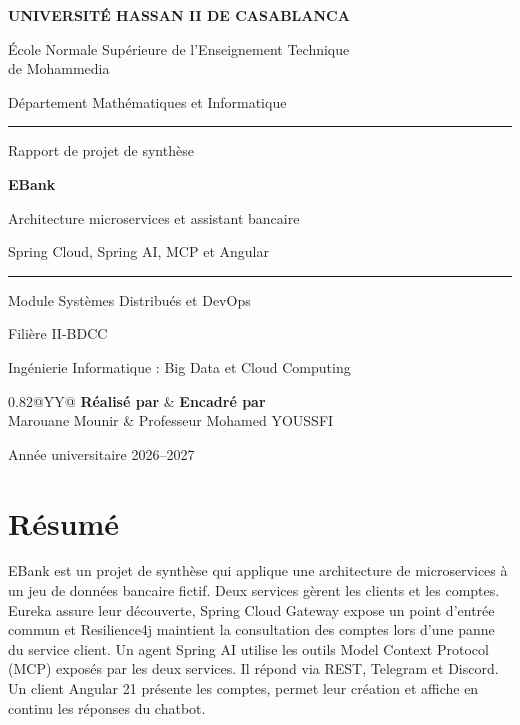 \documentclass[11pt,a4paper]{article}
\begin{document}
\begin{titlepage}
\centering
{\large\bfseries\color{Navy} UNIVERSITÉ HASSAN II DE CASABLANCA\par}
\vspace{4mm}
{\large École Normale Supérieure de l'Enseignement Technique\\de Mohammedia\par}
\vspace{5mm}
{\small Département Mathématiques et Informatique\par}
\vspace{15mm}
{\color{Blue}\rule{0.82\linewidth}{1.2pt}\par}
\vspace{9mm}
{\Large Rapport de projet de synthèse\par}
\vspace{6mm}
{\Huge\bfseries\color{Navy} EBank\par}
\vspace{6mm}
{\Large Architecture microservices et assistant bancaire\par}
\vspace{3mm}
{\large Spring Cloud, Spring AI, MCP et Angular\par}
\vspace{9mm}
{\color{Blue}\rule{0.82\linewidth}{1.2pt}\par}
\vspace{10mm}
{\large Module Systèmes Distribués et DevOps\par}
{\large Filière II-BDCC\par}
{\small Ingénierie Informatique : Big Data et Cloud Computing\par}
\vfill
\begin{tabularx}{0.82\linewidth}{@{}YY@{}}
\textbf{Réalisé par} & \textbf{Encadré par}\\[4pt]
Marouane Mounir & Professeur Mohamed YOUSSFI
\end{tabularx}
\vfill
{\large Année universitaire 2026--2027\par}
\end{titlepage}

\section*{Résumé}
EBank est un projet de synthèse qui applique une architecture de microservices à un jeu de données bancaire fictif. Deux services gèrent les clients et les comptes. Eureka assure leur découverte, Spring Cloud Gateway expose un point d'entrée commun et Resilience4j maintient la consultation des comptes lors d'une panne du service client. Un agent Spring AI utilise les outils Model Context Protocol (MCP) exposés par les deux services. Il répond via REST, Telegram et Discord. Un client Angular 21 présente les comptes, permet leur création et affiche en continu les réponses du chatbot.
\end{document}

